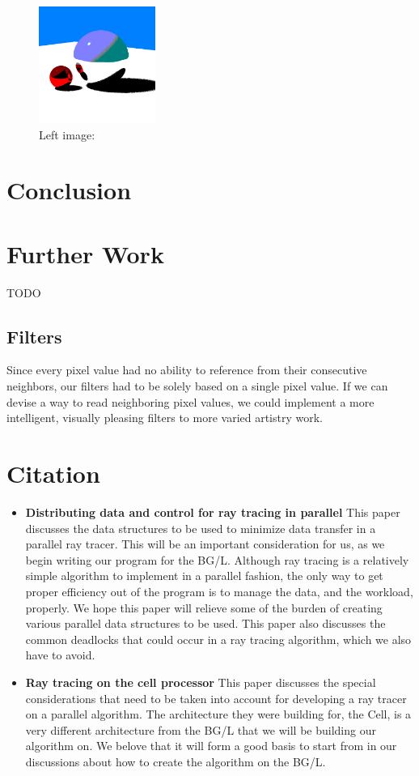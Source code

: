 \documentclass{acmsiggraph}
\begin{document}
\begin{figure}[htp]
\centering
\includegraphics[width=1.5in]{color_shades}
\caption{Left image: }%
\label{limiting_color}
\end{figure}

\section{Conclusion}
\section{Further Work}
TODO

\subsection{Filters}
Since every pixel value had no ability to reference from their consecutive
neighbors, our filters had to be solely based on a single pixel value.  If we
can devise a way to read neighboring pixel values, we could implement a more
intelligent, visually pleasing filters to more varied artistry work.


\section{Citation}

\begin{itemize}
\item
\textbf{Distributing data and control for ray tracing in parallel} This paper
discusses the data structures to be used to minimize data transfer in a parallel
ray tracer. This will be an important consideration for us, as we begin writing
our program for the BG/L. Although ray tracing is a relatively
simple algorithm to implement in a parallel fashion, the only way to get proper
efficiency out of the program is to manage the data, and the workload, properly.
We hope this paper will relieve some of the burden of creating various parallel
data structures to be used. This paper also discusses the common deadlocks that
could occur in a ray tracing algorithm, which we also have to
avoid.\cite{badouel1994dda}
\item
\textbf{Ray tracing on the cell processor} This paper discusses the special
considerations that need to be taken into account for developing a ray tracer on
a parallel algorithm. The architecture they were building for, the Cell, is a
very different architecture from the BG/L that we will be building our algorithm
on. We belove that it will form a good basis to start from in our discussions
about how to create the algorithm on the BG/L.\cite{benthin2006rtc}
\end{itemize}



\end{document}
